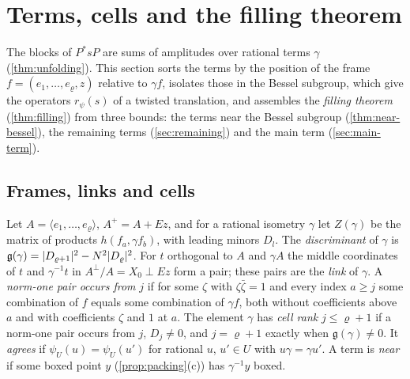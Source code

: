 \section{Terms, cells and the filling theorem}\label{sec:terms}

The blocks of $P^*sP$ are sums of amplitudes over rational terms $\gamma$ (\cref{thm:unfolding}). This section sorts the terms by the position of the frame
$f=(e_1,\dots,e_\varrho,z)$ relative to $\gamma f$, isolates those in the Bessel subgroup, which give the operators $r_\psi(s)$ of a twisted translation, and assembles the
\emph{filling theorem} (\cref{thm:filling}) from three bounds: the terms near the Bessel subgroup (\cref{thm:near-bessel}), the remaining terms
(\cref{sec:remaining}) and the main term (\cref{sec:main-term}).

\subsection{Frames, links and cells}\label{ss:links}
Let $A=\langle e_1,\dots,e_\varrho\rangle$, $A^+=A+Ez$, and for a rational isometry $\gamma$ let $Z(\gamma)$ be the matrix of products $h(f_a,\gamma f_b)$, with leading minors $D_l$. The
\emph{discriminant} of $\gamma$ is $\mathfrak g(\gamma)=\lvert D_{\varrho+1}\rvert^2-N^2\lvert D_\varrho\rvert^2$. For $t$ orthogonal to $A$ and $\gamma A$ the middle coordinates of $t$ and $\gamma^{-1}t$ in
$A^\perp/A=X_0\perp Ez$ form a pair; these pairs are the \emph{link} of $\gamma$. A \emph{norm-one pair occurs from} $j$ if for some $\zeta$ with $\zeta\bar\zeta=1$ and every index $a\ge j$ some
combination of $f$ equals some combination of $\gamma f$, both without coefficients above $a$ and with coefficients $\zeta$ and $1$ at $a$. The element $\gamma$ has \emph{cell rank} $j\le\varrho+1$ if a
norm-one pair occurs from $j$, $D_j\ne0$, and $j=\varrho+1$ exactly when $\mathfrak g(\gamma)\ne0$. It \emph{agrees} if $\psi_U(u)=\psi_U(u')$ for rational $u$, $u'\in U$ with $u\gamma=\gamma u'$. A term is
\emph{near} if some boxed point $y$ (\cref{prop:packing}(c)) has $\gamma^{-1}y$ boxed.


